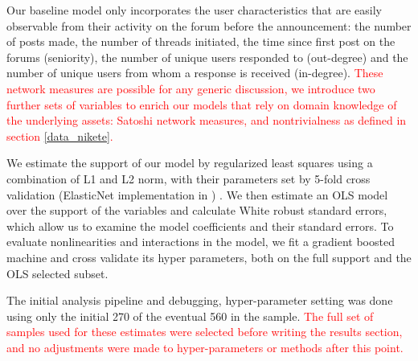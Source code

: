 Our baseline model only incorporates the user characteristics that are easily observable from their activity on the forum before the announcement: the number of posts made, the number of threads initiated, the time since first post on the forums (seniority), the number of unique users responded to (out-degree) and the number of unique users from whom a response is received (in-degree).
\textcolor{red}{These network measures are possible for any generic discussion, we introduce two further sets of variables to enrich our models that rely on domain knowledge of the underlying assets: Satoshi network measures, and nontrivialness as defined in section \ref{data_nikete}.}

We estimate the support of our model by regularized least squares using a combination of L1 and L2 norm, with their parameters set by 5-fold cross validation  (ElasticNet implementation in \cite{scikit-learn}) . 
We then estimate an OLS model over the support of the variables and calculate White robust standard errors, which allow us to examine the model coefficients and their standard errors. 
To evaluate nonlinearities and interactions in the model, we fit a gradient boosted machine and cross validate its hyper parameters, both on the full support and the OLS selected subset. 

The initial analysis pipeline and debugging, hyper-parameter setting was done using only the initial 270 of the eventual 560 in the sample.
\textcolor{red}{The full set of samples used for these estimates were selected before writing the results section, and no adjustments were made to hyper-parameters or methods after this point.}
